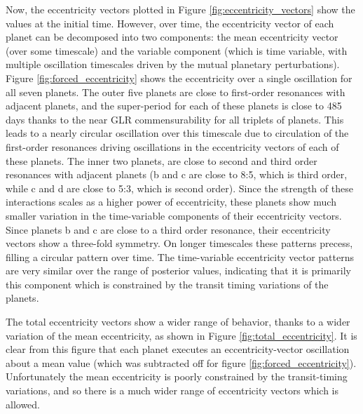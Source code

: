\documentclass[fleqn,usenatbib]{mnras} %
\begin{document}
Now, the eccentricity vectors plotted in Figure \ref{fig:eccentricity_vectors} show the
values at the initial time. However, over time, the eccentricity vector of each planet can be decomposed into two components: the mean eccentricity vector (over some timescale) and the variable component (which is time variable, with multiple oscillation timescales driven by the mutual planetary perturbations).   Figure \ref{fig:forced_eccentricity}
shows the eccentricity over a single oscillation for all seven planets.  The outer five
planets are close to first-order resonances with adjacent planets, and the super-period
for each of these planets is close to 485 days thanks to the near GLR commensurability
for all triplets of planets.  This leads to a nearly circular oscillation over this timescale
due to circulation of the first-order resonances driving oscillations in the eccentricity
vectors of each of these planets.  The inner two planets, are close to second and third
order resonances with adjacent planets (b and c are close to 8:5, which is third order,
while c and d are close to 5:3, which is second order).  Since the strength of these
interactions scales as a higher power of eccentricity, these planets show much smaller variation
in the time-variable components of their eccentricity vectors.  Since planets b and c are 
close to a third order resonance,
their eccentricity vectors show a three-fold symmetry.  On longer timescales these patterns
precess, filling a circular pattern over time.  The time-variable eccentricity vector patterns are
very similar over the range of posterior values, indicating that it is primarily this
component which is constrained by the transit timing variations of the planets.

The total eccentricity vectors show a wider range of behavior, thanks to a wider variation
of the mean eccentricity, as shown in Figure \ref{fig:total_eccentricity}.  It is clear
from this figure that each planet executes an eccentricity-vector oscillation about a
mean value (which was subtracted off for figure \ref{fig:forced_eccentricity}).  Unfortunately the mean eccentricity is poorly constrained by the transit-timing
variations, and so there is a much wider range of eccentricity vectors which is allowed.
\end{document}
